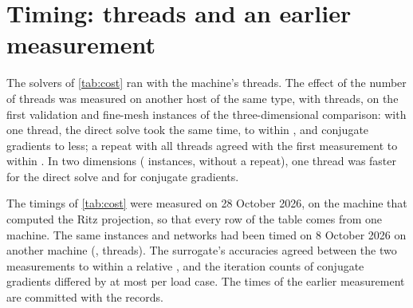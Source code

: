 \section{Timing: threads and an earlier measurement}\label{supp:timing}

The solvers of \cref{tab:cost} ran with the machine's \numCostThreads{} threads. The effect
of the number of threads was measured on another host of the same type, with
\numThreadsHost{} threads, on the first \numThreadsValN{} validation and \numThreadsFineN{}
fine-mesh instances of the three-dimensional comparison: with one thread, the direct solve
took the same time, to within \numThreadsDirectDev{}, and conjugate gradients
\numThreadsCgGainMin{} to \numThreadsCgGainMax{} less; a repeat with all threads agreed with
the first measurement to within \numThreadsDrift{}. In two dimensions (\numThreadsTwoN{}
instances, without a repeat), one thread was \numThreadsTwoDirect{} faster for the direct
solve and \numThreadsTwoCg{} for conjugate gradients.

The timings of \cref{tab:cost} were measured on 28 October 2026, on the machine
that computed the Ritz projection, so that every row of the table comes from one machine.
The same instances and networks had been timed on 8 October 2026 on another machine
(\numRerunCpu{}, \numRerunThreads{} threads). The surrogate's accuracies agreed between the
two measurements to within a relative \numRerunAccDev{}, and the iteration counts of
conjugate gradients differed by at most \numRerunIters{} per load case. The times of the
earlier measurement are committed with the records.
